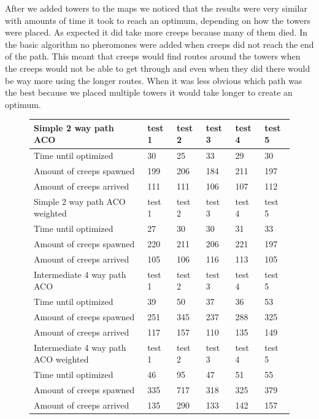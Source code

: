 After we added towers to the maps we noticed that the results were very similar with amounts of time it took to reach an optimum, depending on how the towers were placed. As expected it did take more creeps because many of them died. In the basic algorithm no pheromones were added when creeps did not reach the end of the path. This meant that creeps would find routes around the towers when the creeps would not be able to get through and even when they did there would be way more using the longer routes. When it was less obvious which path was the best because we placed multiple towers it would take longer to create an optimum.

\begin{figure}[H]
	\begin{tabular}{|l|l|l|l|l|l|}
	\hline
		Simple 2 way path ACO    & test 1 & test 2 & test 3 & test 4 & test 5 \\\hline
		Time until optimized     & 30     & 25     & 33     & 29     & 30     \\
		Amount of creeps spawned & 199    & 206    & 184    & 211    & 197    \\
		Amount of creeps arrived & 111    & 111    & 106    & 107    & 112    \\
	\hline
		Simple 2 way path ACO weighted & test 1 & test 2 & test 3 & test 4 & test 5 \\ \hline
		Time until optimized           & 27     & 30     & 30     & 31     & 33     \\
		Amount of creeps spawned       & 220    & 211    & 206    & 221    & 197    \\
		Amount of creeps arrived       & 105    & 106    & 116    & 113    & 105    \\\hline
		Intermediate 4 way path ACO & test 1 & test 2 & test 3 & test 4 & test 5 \\\hline
		Time until optimized        & 39     & 50     & 37     & 36     & 53     \\
		Amount of creeps spawned    & 251    & 345    & 237    & 288    & 325    \\
		Amount of creeps arrived    & 117    & 157    & 110    & 135    & 149    \\\hline
		
		Intermediate 4 way path ACO weighted & test 1 & test 2 & test 3 & test 4 & test 5 \\\hline
		Time until optimized                 & 46     & 95     & 47     & 51     & 55     \\
		Amount of creeps spawned             & 335    & 717    & 318    & 325    & 379    \\
		Amount of creeps arrived             & 135    & 290    & 133    & 142    & 157    \\\hline
		

\end{tabular}
\end{figure}
